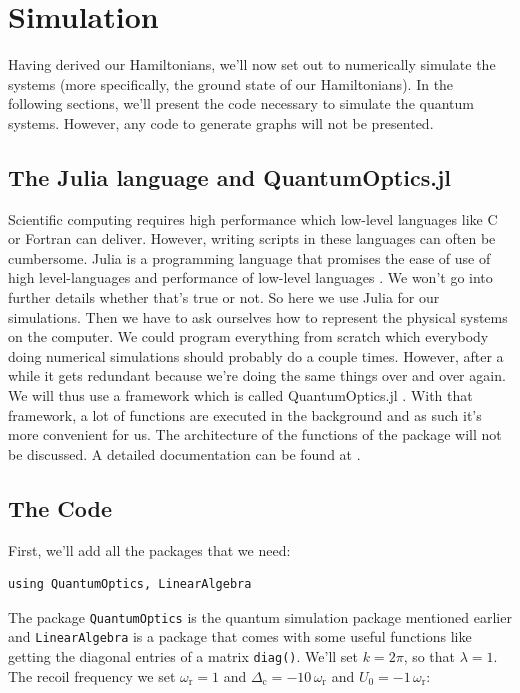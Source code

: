 \section{Simulation}
Having derived our Hamiltonians, we'll now set out to numerically simulate the systems (more specifically, the ground state of our Hamiltonians). In the following sections, we'll present the code necessary to simulate the quantum systems. However, any code to generate graphs will not be presented.

\subsection{The Julia language and QuantumOptics.jl}
Scientific computing requires high performance which low-level languages like C or Fortran can deliver. However, writing scripts in these languages can often be cumbersome. Julia is a programming language that promises the ease of use of high level-languages and performance of low-level languages \cite{julialang}. We won't go into further details whether that's true or not. So here we use Julia for our simulations. Then we have to ask ourselves how to represent the physical systems on the computer. We could program everything from scratch which everybody doing numerical simulations should probably do a couple times. However, after a while it gets redundant because we're doing the same things over and over again. We will thus use a framework which is called QuantumOptics.jl \cite{qojulia}. With that framework, a lot of functions are executed in the background and as such it's more convenient for us. The architecture of the functions of the package will not be discussed. A detailed documentation can be found at \cite{documentation}.

\subsection{The Code}
First, we'll add all the packages that we need:

\begin{lstlisting}
using QuantumOptics, LinearAlgebra
\end{lstlisting}The package \texttt{QuantumOptics} is the quantum simulation package mentioned earlier and \texttt{LinearAlgebra} is a package that comes with some useful functions like getting the diagonal entries of a matrix \texttt{diag()}. We'll set $k=2\pi$, so that $\lambda=1$. The recoil frequency we set $\omega_\text{r} = 1$ and $\Delta_\text{c} = -10 \, \omega_\text{r}$ and $U_0 = -1 \, \omega_\text{r}$:

